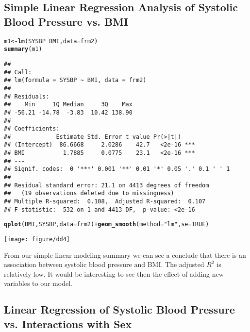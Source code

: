 \documentclass{article}\usepackage[]{graphicx}\usepackage[]{color}
\makeatletter
\def\maxwidth{ %
  \ifdim\Gin@nat@width>\linewidth
    \linewidth
  \else
    \Gin@nat@width
  \fi
}
\newcommand{\hlnum}[1]{\textcolor[rgb]{0.686,0.059,0.569}{#1}}%
\newcommand{\hlstr}[1]{\textcolor[rgb]{0.192,0.494,0.8}{#1}}%
\newcommand{\hlopt}[1]{\textcolor[rgb]{0,0,0}{#1}}%
\newcommand{\hlstd}[1]{\textcolor[rgb]{0.345,0.345,0.345}{#1}}%
\newcommand{\hlkwb}[1]{\textcolor[rgb]{0.69,0.353,0.396}{#1}}%
\newcommand{\hlkwc}[1]{\textcolor[rgb]{0.333,0.667,0.333}{#1}}%
\newcommand{\hlkwd}[1]{\textcolor[rgb]{0.737,0.353,0.396}{\textbf{#1}}}%
\newenvironment{kframe}{%
 \def\at@end@of@kframe{}%
 \ifinner\ifhmode%
  \def\at@end@of@kframe{\end{minipage}}%
  \begin{minipage}{\columnwidth}%
 \fi\fi%
 \def\FrameCommand##1{\hskip\@totalleftmargin \hskip-\fboxsep
 \colorbox{shadecolor}{##1}\hskip-\fboxsep
     \hskip-\linewidth \hskip-\@totalleftmargin \hskip\columnwidth}%
 \MakeFramed {\advance\hsize-\width
   \@totalleftmargin\z@ \linewidth\hsize
   \@setminipage}}%
 {\par\unskip\endMakeFramed%
 \at@end@of@kframe}
\newenvironment{knitrout}{}{} %
\makeatother
\begin{document}
\subsection{Simple Linear Regression Analysis of Systolic Blood Pressure vs. BMI}
\begin{knitrout}
\color{fgcolor}\begin{kframe}
\begin{alltt}
\hlstd{m1} \hlkwb{<-} \hlkwd{lm}\hlstd{(SYSBP} \hlopt{~} \hlstd{BMI,} \hlkwc{data} \hlstd{= frm2)}
\hlkwd{summary}\hlstd{(m1)}
\end{alltt}
\begin{verbatim}
## 
## Call:
## lm(formula = SYSBP ~ BMI, data = frm2)
## 
## Residuals:
##    Min     1Q Median     3Q    Max 
## -56.21 -14.78  -3.83  10.42 138.90 
## 
## Coefficients:
##             Estimate Std. Error t value Pr(>|t|)    
## (Intercept)  86.6668     2.0286    42.7   <2e-16 ***
## BMI           1.7885     0.0775    23.1   <2e-16 ***
## ---
## Signif. codes:  0 '***' 0.001 '**' 0.01 '*' 0.05 '.' 0.1 ' ' 1
## 
## Residual standard error: 21.1 on 4413 degrees of freedom
##   (19 observations deleted due to missingness)
## Multiple R-squared:  0.108,	Adjusted R-squared:  0.107 
## F-statistic:  532 on 1 and 4413 DF,  p-value: <2e-16
\end{verbatim}
\begin{alltt}
\hlkwd{qplot}\hlstd{(BMI, SYSBP,} \hlkwc{data} \hlstd{= frm2)} \hlopt{+} \hlkwd{geom_smooth}\hlstd{(}\hlkwc{method} \hlstd{=} \hlstr{"lm"}\hlstd{,} \hlkwc{se} \hlstd{=} \hlnum{TRUE}\hlstd{)}
\end{alltt}


{\ttfamily\noindent\color{warningcolor}{\#\# Warning: Removed 19 rows containing missing values (stat\_smooth).\\\#\# Warning: Removed 19 rows containing missing values (geom\_point).}}\end{kframe}
\texttt{[image: figure/dd4]} 

\end{knitrout}

From our simple linear modeling summary we can see a conclude that there is an association between systolic blood pressure and BMI.  The adjusted $R^2$ is relatively low.  It would be interesting to see then the effect of adding new variables to our model.

\subsection{Linear Regression of Systolic Blood Pressure vs. Interactions with Sex}
\end{document}
